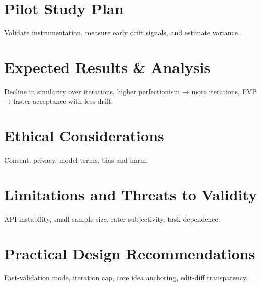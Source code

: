 \documentclass[conference]{IEEEtran} %
\begin{document}
\section{Pilot Study Plan}
Validate instrumentation, measure early drift signals, and estimate variance.

\section{Expected Results \& Analysis}
Decline in similarity over iterations, higher perfectionism → more iterations, FVP → faster acceptance with less drift.

\section{Ethical Considerations}
Consent, privacy, model terms, bias and harm.

\section{Limitations and Threats to Validity}
API instability, small sample size, rater subjectivity, task dependence.

\section{Practical Design Recommendations}
Fast-validation mode, iteration cap, core idea anchoring, edit-diff transparency.
\end{document}
